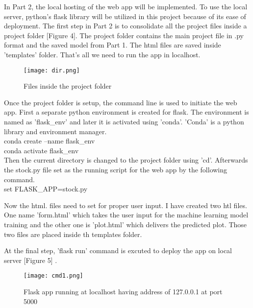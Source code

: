 \documentclass[11pt]{diazessay} %
\begin{document}
In Part 2, the local hosting of the web app will be implemented. To use the local server, python's flask library will be utilized in this project because of its ease of deployment. The first step in Part 2 is to consolidate all the project files inside a project folder [Figure 4]. The project folder contains the main project file in .py format and the saved model from Part 1. The html files are saved inside 'templates' folder. That's all we need to run the app in localhost.

\begin{figure}[!h]
\begin{center}
\texttt{[image: dir.png]} %
\caption{Files inside the project folder}
\end{center}
\end{figure}

Once the project folder is setup, the command line is used to initiate the web app. First a separate python environment is created for flask. The environment is named as 'flask\_env' and later it is activated using 'conda'.
'Conda' is a python library and environment manager.\\

{\selectfont
\noindent conda create --name flask\_env\\
conda activate flask\_env\\
}
Then the current directory is changed to the project folder using 'cd'. Afterwards the stock.py file set as the running script for the web app by the following command.\\

{\selectfont
\noindent set FLASK\_APP=stock.py\\
}

Now the html. files need to set for proper user input. I have created two htl files. One name 'form.html' which takes the user input for the machine learning model training and the other one is 'plot.html' which delivers the predicted plot. Those two files are placed inside th templates folder.

At the final step, 'flask run' command is excuted to deploy the app on local server [Figure 5] .

\begin{figure}[!h]
\begin{center}
\texttt{[image: cmd1.png]} %
\caption{Flask app running at localhost having address of 127.0.0.1 at port 5000}
\end{center}
\end{figure}
\end{document}
